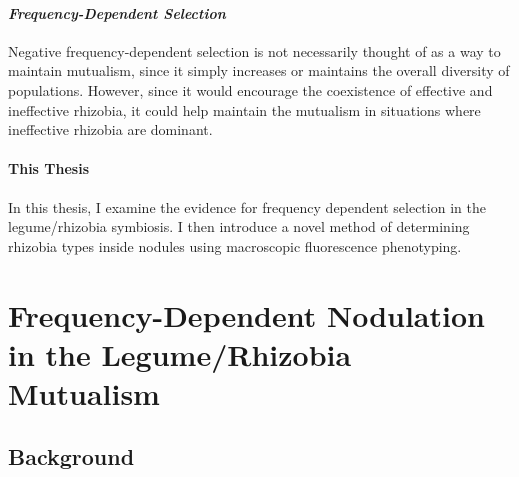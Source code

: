 \documentclass[12pt]{article}
\begin{document}
\begin{doublespace}
 \paragraph{\textit{Frequency-Dependent Selection}} Negative frequency-dependent selection is not necessarily thought of as a way to maintain mutualism, since it simply increases or maintains the overall diversity of populations. However, since it would encourage the coexistence of effective and ineffective rhizobia, it could help maintain the mutualism in situations where ineffective rhizobia are dominant. 
	\paragraph{This Thesis} 
In this thesis, I examine the evidence for frequency dependent selection in the legume/rhizobia symbiosis.  I then introduce a novel method of determining rhizobia types inside nodules using macroscopic fluorescence phenotyping. 
	


\newpage
\section{Frequency-Dependent Nodulation in the \newline Legume/Rhizobia Mutualism} 
\subsection{Background}

\end{doublespace}
\end{document}
